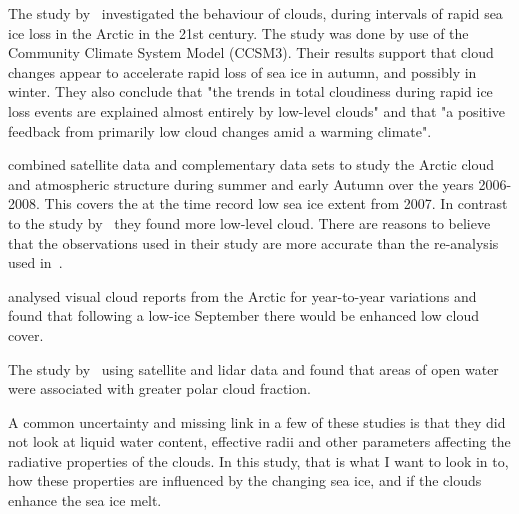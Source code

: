 The study by~\citet{Vavrus2010} investigated the behaviour of clouds, during intervals of rapid sea ice loss in the Arctic in the 21st century. The study was done by use of the Community Climate System Model (CCSM3). Their results support that cloud changes appear to accelerate rapid loss of sea ice in autumn, and possibly in winter. They also conclude that "the trends in total cloudiness during rapid ice loss events are explained almost entirely by low-level clouds" and that "a positive feedback from primarily low cloud changes amid a warming climate".

\citet{Kay2009} combined satellite data and complementary data sets to study the Arctic cloud and atmospheric structure during summer and early Autumn over the years 2006-2008. This covers the at the time record low sea ice extent from 2007. In contrast to the study by~\citet{Schweiger2008} they found more low-level cloud. There are reasons to believe that the observations used in their study are more accurate than the re-analysis used in~\citet{Schweiger2008}.


\citet{Eastman2010a} analysed visual cloud reports from the Arctic for year-to-year variations and found that following a low-ice September there would be enhanced low cloud cover.

The study by~\citet{Palm2010} using satellite and lidar data and found that areas of open water were associated with greater polar cloud fraction. %


A common uncertainty and missing link in a few of these studies is that they did not look at liquid water content, effective radii and other parameters affecting the radiative properties of the clouds. In this study, that is what I want to look in to, how these properties are influenced by the changing sea ice, and if the clouds enhance the sea ice melt.






